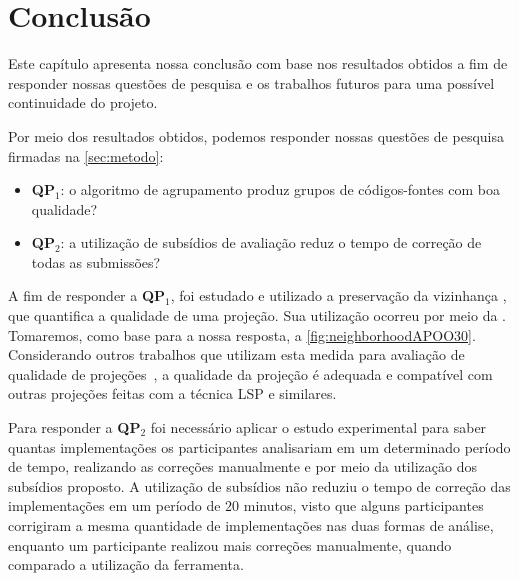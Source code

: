 \chapter{Conclusão}
\label{chap:Conclusao}

	Este capítulo apresenta nossa conclusão com base nos resultados obtidos a fim de
	responder nossas questões de pesquisa e os trabalhos futuros para uma possível
	continuidade do projeto.
	
	Por meio dos resultados obtidos, podemos responder nossas questões de pesquisa
	firmadas na \cref{sec:metodo}:
	
	\begin{itemize}
		\item \textbf{QP$_1$}: o algoritmo de agrupamento produz grupos de códigos-fontes
		com boa qualidade?
		\item \textbf{QP$_2$}: a utilização de subsídios de avaliação reduz o tempo
		de correção de todas as submissões?
	\end{itemize}
	
	A fim de responder a \textbf{QP$_1$}, foi estudado e utilizado a preservação
	da vizinhança \cite{paulovich2008hipp}, que quantifica a qualidade de uma projeção.
	Sua utilização ocorreu por meio da . Tomaremos, como base
	para a nossa resposta, a \cref{fig:neighborhoodAPOO30}.
	Considerando outros trabalhos que utilizam esta medida para avaliação de qualidade
	de projeções~\cite{phd:paulovich},
	a qualidade da projeção é adequada e compatível com outras projeções feitas com a técnica LSP e similares.
	
	Para responder a \textbf{QP$_2$} foi necessário aplicar o estudo experimental
	para saber quantas implementações os participantes analisariam em um determinado
	período de tempo, realizando as correções manualmente e por meio da utilização dos
	subsídios proposto. A utilização de subsídios não reduziu o tempo de correção
	das implementações em um período de $20$ minutos, visto que alguns participantes
	corrigiram a mesma quantidade de implementações nas duas formas de análise, enquanto
	um participante realizou mais correções manualmente, quando comparado a utilização
	da ferramenta.

